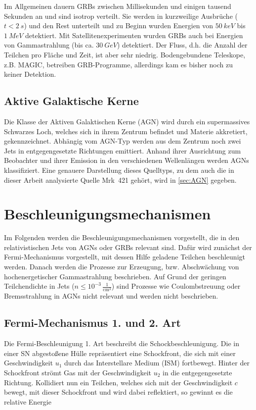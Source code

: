 Im Allgemeinen dauern GRBs zwischen Millisekunden und einigen tausend Sekunden an und sind isotrop verteilt.
Sie werden in kurzweilige Ausbrüche ($t<\SI{2}{s}$) und den Rest unterteilt und zu Beginn wurden Energien von $\SI{50}{keV}$ bis $\SI{1}{MeV}$ detektiert.
Mit Satellitenexperimenten wurden GRBs auch bei Energien von Gammastrahlung (bis ca. $\SI{30}{GeV}$) detektiert.
Der Fluss, d.h. die Anzahl der Teilchen pro Fläche und Zeit, ist aber sehr niedrig.
Bodengebundene Teleskope, z.B. MAGIC, betreiben GRB-Programme, allerdings kam es bisher noch zu keiner Detektion.\cite{Weekes}


\subsection{Aktive Galaktische Kerne}
Die Klasse der Aktiven Galaktischen Kerne (AGN) wird durch ein supermassives Schwarzes Loch, welches sich in ihrem Zentrum befindet und Materie akkretiert, gekennzeichnet.
Abhängig vom AGN-Typ werden aus dem Zentrum noch zwei Jets in entgegengesetzte Richtungen emittiert.  
Anhand ihrer Ausrichtung zum Beobachter und ihrer Emission in den verschiedenen Wellenlängen werden AGNs klassifiziert. 
Eine genauere Darstellung dieses Quelltyps, zu dem auch die in dieser Arbeit analysierte Quelle Mrk~421 gehört, wird in \autoref{sec:AGN} gegeben.

\section{Beschleunigungsmechanismen} 
\label{sec:Beschleunigungsmechanismen}
Im Folgenden werden die Beschleunigungsmechanismen vorgestellt, die in den relativistischen Jets von AGNs oder GRBs relevant sind.
Dafür wird zunächst der Fermi-Mechanismus vorgestellt, mit dessen Hilfe geladene Teilchen beschleunigt werden.
Danach werden die Prozesse zur Erzeugung, bzw. Abschwächung von hochenergetischer Gammastrahlung beschrieben.
Auf Grund der geringen Teilchendichte in Jets ($n\leq 10^{-3}\,\frac{1}{\text{cm}^3}$) \cite{RelativisticJets} sind Prozesse wie Coulombstreuung oder Bremsstrahlung in AGNs nicht relevant und werden nicht beschrieben.

\subsection{Fermi-Mechanismus 1. und 2. Art}
Die Fermi-Beschleunigung 1. Art beschreibt die Schockbeschleunigung.
Die in einer SN abgestoßene Hülle repräsentiert eine Schockfront, die sich mit einer Geschwindigkeit $u_1$ durch das Interstellare Medium (ISM) fortbewegt. 
Hinter der Schockfront strömt Gas mit der Geschwindigkeit $u_2$ in die entgegengesetzte Richtung.
Kollidiert nun ein Teilchen, welches sich mit der Geschwindigkeit $c$ bewegt, mit dieser Schockfront und wird dabei reflektiert, so gewinnt es die relative Energie

